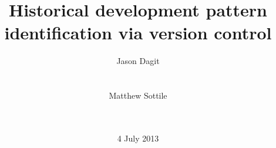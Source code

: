 \documentclass{acm_proc_article-sp}
\begin{document}
\title{Historical development pattern identification via version control}

%
%
%
%
%

%
\author{
%
%
\alignauthor
Jason Dagit\\
       \\
       \\
\alignauthor
Matthew Sottile\\
       \\
       \\
}
\date{4 July 2013}
\end{document}
